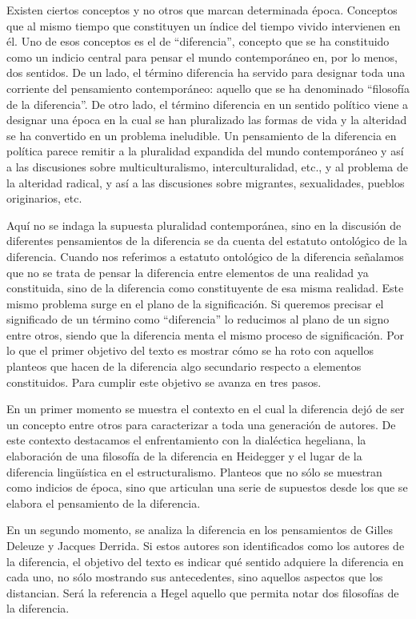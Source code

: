 \documentclass{book}
\begin{document}
Existen ciertos conceptos y no otros que marcan determinada época.
Conceptos que al mismo tiempo que constituyen un índice del tiempo
vivido intervienen en él. Uno de esos conceptos es el de \enquote{diferencia},
concepto que se ha constituido como un indicio central para pensar el
mundo contemporáneo en, por lo menos, dos sentidos. De un lado, el
término diferencia ha servido para designar toda una corriente del
pensamiento contemporáneo: aquello que se ha denominado \enquote{filosofía de la
diferencia}. De otro lado, el término diferencia en un sentido político
viene a designar una época en la cual se han pluralizado las formas de
vida y la alteridad se ha convertido en un problema ineludible. Un
pensamiento de la diferencia en política parece remitir a la pluralidad
expandida del mundo contemporáneo y así a las discusiones sobre
multiculturalismo, interculturalidad, etc., y al problema de la
alteridad radical, y así a las discusiones sobre migrantes,
sexualidades, pueblos originarios, etc.

Aquí no se indaga la supuesta pluralidad contemporánea, sino en la
discusión de diferentes pensamientos de la diferencia se da cuenta del
estatuto ontológico de la diferencia. Cuando nos referimos a estatuto
ontológico de la diferencia señalamos que no se trata de pensar la
diferencia entre elementos de una realidad ya constituida, sino de la
diferencia como constituyente de esa misma realidad. Este mismo problema
surge en el plano de la significación. Si queremos precisar el
significado de un término como \enquote{diferencia} lo reducimos al plano de un
signo entre otros, siendo que la diferencia menta el mismo proceso de
significación. Por lo que el primer objetivo del texto es mostrar cómo
se ha roto con aquellos planteos que hacen de la diferencia algo
secundario respecto a elementos constituidos. Para cumplir este objetivo
se avanza en tres pasos.

En un primer momento se muestra el contexto en el cual la diferencia
dejó de ser un concepto entre otros para caracterizar a toda una
generación de autores. De este contexto destacamos el enfrentamiento con
la dialéctica hegeliana, la elaboración de una filosofía de la
diferencia en Heidegger y el lugar de la diferencia lingüística en el
estructuralismo. Planteos que no sólo se muestran como indicios de
época, sino que articulan una serie de supuestos desde los que se
elabora el pensamiento de la diferencia.

En un segundo momento, se analiza la diferencia en los pensamientos de
Gilles Deleuze y Jacques Derrida. Si estos autores son identificados
como los autores de la diferencia, el objetivo del texto es indicar qué
sentido adquiere la diferencia en cada uno, no sólo mostrando sus
antecedentes, sino aquellos aspectos que los distancian. Será la
referencia a Hegel aquello que permita notar dos filosofías de la
diferencia.
\end{document}
